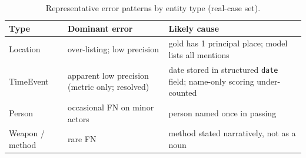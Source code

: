 \documentclass[conference]{IEEEtran}
\begin{document}
\begin{table}[t]
  \centering
  \caption{Representative error patterns by entity type (real-case set).}
  \label{tab:errors}
  \footnotesize
  \setlength{\tabcolsep}{3.5pt}
  \begin{tabular}{@{}P{1.5cm}P{2.6cm}P{3.0cm}@{}}
    \toprule
    \textbf{Type} & \textbf{Dominant error} & \textbf{Likely cause} \\
    \midrule
    Location  & over-listing; low precision & gold has 1 principal place; model lists all mentions \\
    TimeEvent & apparent low precision (metric only; resolved) & date stored in structured \texttt{date} field; name-only scoring under-counted \\
    Person    & occasional FN on minor actors & person named once in passing \\
    Weapon / method & rare FN & method stated narratively, not as a noun \\
    \bottomrule
  \end{tabular}
\end{table}
\end{document}

